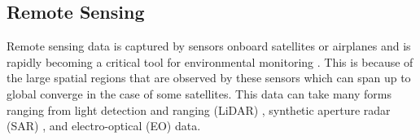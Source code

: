 \subsection{Remote Sensing}
Remote sensing data is captured by sensors onboard satellites or airplanes and is rapidly becoming a critical tool for environmental monitoring \cite{Parra2022RemoteMonitoring}. This is because of the large spatial regions that are observed by these sensors which can span up to global converge in the case of some satellites. This data can take many forms ranging from light detection and ranging (LiDAR) \cite{LiDARForestryBeland2019}, synthetic aperture radar (SAR) \cite{Hall2020WhatEarthdata}, and electro-optical (EO) data.





